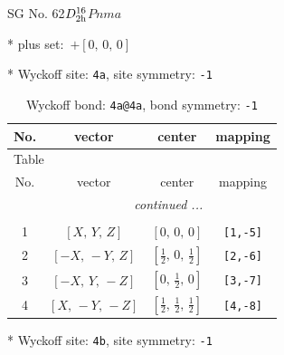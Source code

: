 \documentclass[fleqn,8pt]{jsarticle}
\begin{document}
\setcounter{MaxMatrixCols}{32}

\renewcommand{\tablename}{Table~}
\renewcommand{\figurename}{Figure~}
\begin{center}
\LARGE
SG No. 62\quad$D_{\rm 2h}^{16}$\quad$Pnma$\quad[ orthorhombic ]
\end{center}

* plus set:\,\,\,$+\left[ 0,\, 0,\, 0 \right]$


* Wyckoff site: {\tt 4a}, site symmetry: {\tt -1}
\renewcommand{\arraystretch}{1.2}
\begin{longtable}{cccc}
\caption{Wyckoff bond: {\tt 4a@4a}, bond symmetry: {\tt -1}}
 \\
 \hline \hline
No. & vector & center & mapping \\ \hline \endfirsthead

\multicolumn{3}{l}{\tablename\ \thetable{}} \\
 \hline \hline
No. & vector & center & mapping \\ \hline \endhead

 \hline \hline
\multicolumn{3}{r}{\footnotesize\it continued ...} \\ \endfoot

 \hline \hline
\multicolumn{3}{r}{} \\ \endlastfoot

1 & $\left[ X,\, Y,\, Z \right]$ & $\left[ 0,\, 0,\, 0 \right]$ & {\tt [1,-5]} \\ \hline
2 & $\left[ - X,\, - Y,\, Z \right]$ & $\left[ \frac{1}{2},\, 0,\, \frac{1}{2} \right]$ & {\tt [2,-6]} \\ \hline
3 & $\left[ - X,\, Y,\, - Z \right]$ & $\left[ 0,\, \frac{1}{2},\, 0 \right]$ & {\tt [3,-7]} \\ \hline
4 & $\left[ X,\, - Y,\, - Z \right]$ & $\left[ \frac{1}{2},\, \frac{1}{2},\, \frac{1}{2} \right]$ & {\tt [4,-8]} \\
\end{longtable}
* Wyckoff site: {\tt 4b}, site symmetry: {\tt -1}
\renewcommand{\arraystretch}{1.2}
\end{document}
